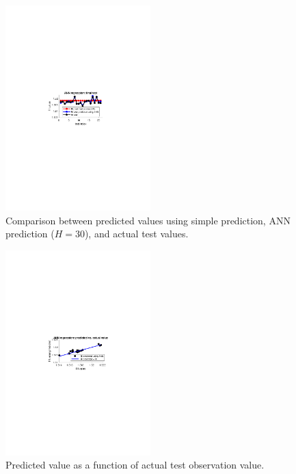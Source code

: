 \begin{multicols}{2}
\begin{figure}[H]
    \centering
    \includegraphics[width=0.50\textwidth]{fig/regression/ANN_reg_evaluating_best_model_rbk.pdf}
    \caption{Comparison between predicted values using simple prediction, ANN prediction ($H=30$), and actual test values.}
    \label{fig:ANN_reg_evaluating_best_model_rbk}
\end{figure}

\begin{figure}[H]
    \centering
    \includegraphics[width=0.50\textwidth]{fig/regression/ANN_reg_evaluating_best_model_line.pdf}
    \caption{Predicted value as a function of actual test observation value.}
    \label{fig:ANN_reg_evaluating_best_model_line}
\end{figure}
\end{multicols}
